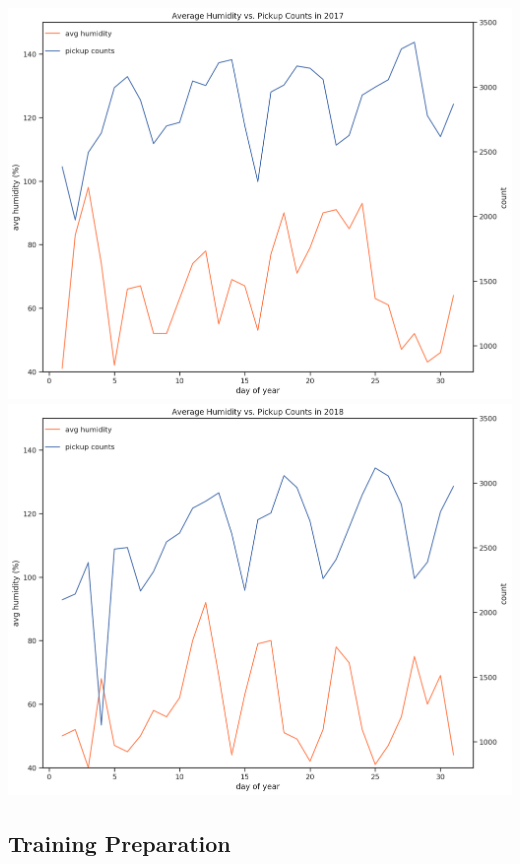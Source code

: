 \documentclass[journal]{IEEEtran}
\begin{document}
\begingroup
    \centering
    \includegraphics[width=\columnwidth]{report/images/2017_humidity_count.png}
    \label{fig:2017_hum_count}
    \medskip
\endgroup
\begingroup
    \centering
    \includegraphics[width=\columnwidth]{report/images/2018_humidity_count.png}
    \label{fig:2018_hum_count}
    \medskip
\endgroup

\subsection{Training Preparation}
\end{document}
